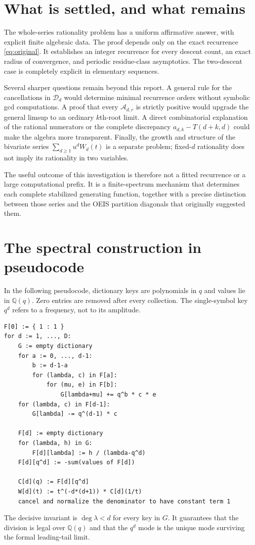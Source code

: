 \documentclass[11pt,letterpaper]{article}
\numberwithin{equation}{section}
\theoremstyle{definition}
\theoremstyle{remark}
\newcommand{\Q}{\mathbb Q}
\begin{document}
\section{What is settled, and what remains}\label{sec:conclusion}
The whole-series rationality problem has a uniform affirmative answer,
with explicit finite algebraic data. The proof depends only on the exact
recurrence \eqref{eq:original}. It establishes an integer recurrence for
every descent count, an exact radius of convergence, and periodic
residue-class asymptotics. The two-descent case is completely explicit
in elementary sequences.

Several sharper questions remain beyond this report. A general rule for
the cancellations in $\mathcal D_d$ would determine minimal recurrence
orders without symbolic gcd computations. A proof that every
$\mathcal A_{d,r}$ is strictly positive would upgrade the general limsup
to an ordinary $k$th-root limit. A direct combinatorial explanation of the
rational numerators or the complete discrepancy $a_{d,k}-T(d+k,d)$ could
make the algebra more transparent. Finally, the growth and structure of
the bivariate series $\sum_{d\ge1}u^dW_d(t)$ is a separate problem; fixed-$d$
rationality does not imply its rationality in two variables.

The useful outcome of this investigation is therefore not a fitted
recurrence or a large computational prefix. It is a finite-spectrum
mechanism that determines each complete stabilized generating function,
together with a precise distinction between those series and the OEIS
partition diagonals that originally suggested them.

\appendix
\section{The spectral construction in pseudocode}\label{app:algorithm}
In the following pseudocode, dictionary keys are polynomials in $q$ and
values lie in $\Q(q)$. Zero entries are removed after every collection.
The single-symbol key $q^d$ refers to a frequency, not to its amplitude.
\begin{lstlisting}
F[0] := { 1 : 1 }
for d := 1, ..., D:
    G := empty dictionary
    for a := 0, ..., d-1:
        b := d-1-a
        for (lambda, c) in F[a]:
            for (mu, e) in F[b]:
                G[lambda+mu] += q^b * c * e
    for (lambda, c) in F[d-1]:
        G[lambda] -= q^(d-1) * c

    F[d] := empty dictionary
    for (lambda, h) in G:
        F[d][lambda] := h / (lambda-q^d)
    F[d][q^d] := -sum(values of F[d])

    C[d](q) := F[d][q^d]
    W[d](t) := t^(-d*(d+1)) * C[d](1/t)
    cancel and normalize the denominator to have constant term 1
\end{lstlisting}
The decisive invariant is $\deg\lambda<d$ for every key in $G$.
It guarantees that the division is legal over $\Q(q)$ and that the
$q^d$ mode is the unique mode surviving the formal leading-tail limit.
\end{document}
